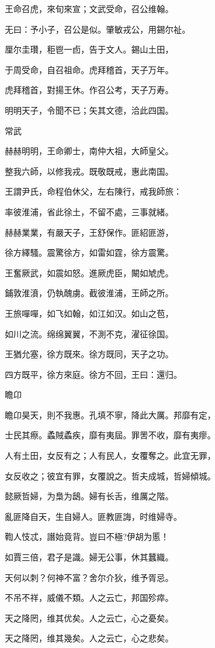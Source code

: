 王命召虎，來旬來宣；文武受命，召公维翰。

无曰：予小子，召公是似。肇敏戎公，用錫尔祉。

厘尔圭瓚，秬鬯一卣，告于文人。錫山土田，

于周受命，自召祖命。虎拜稽首，天子万年。

虎拜稽首，對揚王休。作召公考，天子万寿。

明明天子，令聞不已；矢其文德，洽此四国。

常武

赫赫明明，王命卿士，南仲大祖，大師皇父。

整我六師，以修我戎。既敬既戒，惠此南国。

王謂尹氏，命程伯休父，左右陳行，戒我師旅：

率彼淮浦，省此徐土，不留不處，三事就緒。

赫赫業業，有嚴天子，王舒保作。匪紹匪游，

徐方繹騷。震驚徐方，如雷如霆，徐方震驚。

王奮厥武，如震如怒。進厥虎臣，闞如虓虎。

鋪敦淮濆，仍執醜虜。截彼淮浦，王師之所。

王旅嘽嘽，如飞如翰，如江如汉。如山之苞，

如川之流。绵绵翼翼，不測不克，濯征徐国。

王猶允塞，徐方既來。徐方既同，天子之功。

四方既平，徐方來庭。徐方不回，王曰：還归。

瞻卬

瞻卬昊天，則不我惠。孔填不寧，降此大厲。邦靡有定，

士民其瘵。蟊賊蟊疾，靡有夷屆。罪罟不收，靡有夷瘳。

人有土田，女反有之；人有民人，女覆奪之。此宜无罪，

女反收之；彼宜有罪，女覆說之。哲夫成城，哲婦傾城。

懿厥哲婦，为梟为鴟。婦有长舌，维厲之階。

亂匪降自天，生自婦人。匪教匪誨，时维婦寺。

鞫人忮忒，譖始竟背。豈曰不極?伊胡为慝！

如賈三倍，君子是識。婦无公事，休其蠶織。

天何以刺？何神不富？舍尔介狄，维予胥忌。

不吊不祥，威儀不類。人之云亡，邦国殄瘁。

天之降罔，维其优矣。人之云亡，心之憂矣。

天之降罔，维其幾矣。人之云亡，心之悲矣。

